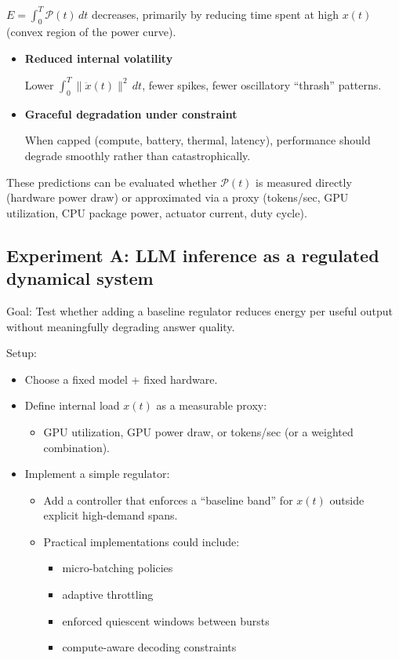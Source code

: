 \documentclass[11pt]{article}
\begin{document}
\(E=\int_{0}^{T}\mathcal{P}(t)\,dt\) decreases, primarily by reducing time spent at high \(x(t)\) (convex region of the power curve).
\begin{itemize}


\item\textbf{Reduced internal volatility}

Lower \( \int_{0}^{T}\lVert\ddot{x}(t)\rVert^{2}\,dt \), fewer spikes, fewer oscillatory “thrash” patterns.

\item\textbf{Graceful degradation under constraint}

When capped (compute, battery, thermal, latency), performance should degrade smoothly rather than catastrophically. 



\end{itemize}
These predictions can be evaluated whether \(\mathcal{P}(t)\) is measured directly (hardware power draw) or approximated via a proxy (tokens/sec, GPU utilization, CPU package power, actuator current, duty cycle).

\subsection{Experiment A: LLM inference as a regulated dynamical system}
Goal: Test whether adding a baseline regulator reduces energy per useful output without meaningfully degrading answer quality. 

Setup:

\begin{itemize}
\item Choose a fixed model + fixed hardware.
\item Define internal load \(x(t)\) as a measurable proxy:
\begin{itemize}
\item GPU utilization, GPU power draw, or tokens/sec (or a weighted combination).
\end{itemize}
\pagebreak
\item Implement a simple regulator:
\begin{itemize}
\item Add a controller that enforces a “baseline band” for \(x(t)\) outside explicit high-demand spans.
\end{itemize}
\begin{itemize}
    \item Practical implementations could include:
\begin{itemize}

\item micro-batching policies
\item adaptive throttling
\item enforced quiescent windows between bursts
\item compute-aware decoding constraints
\end{itemize}
\end{itemize}



\end{itemize}
\end{document}
